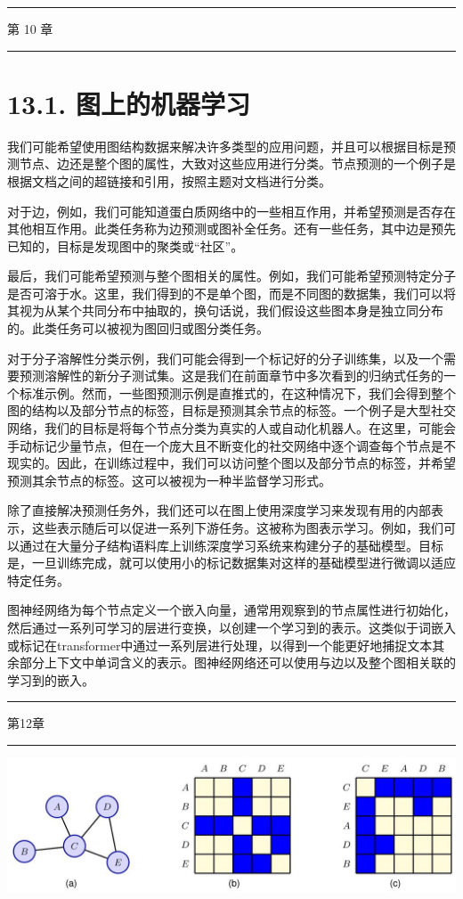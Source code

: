 \documentclass[10pt]{article}
\newcommand{\HRule}{\begin{center}\rule{0.9\linewidth}{0.2mm}\end{center}}
\begin{document}
\HRule

第 10 章

\HRule

\section*{13.1. 图上的机器学习}

我们可能希望使用图结构数据来解决许多类型的应用问题，并且可以根据目标是预测节点、边还是整个图的属性，大致对这些应用进行分类。节点预测的一个例子是根据文档之间的超链接和引用，按照主题对文档进行分类。

对于边，例如，我们可能知道蛋白质网络中的一些相互作用，并希望预测是否存在其他相互作用。此类任务称为边预测或图补全任务。还有一些任务，其中边是预先已知的，目标是发现图中的聚类或“社区”。

最后，我们可能希望预测与整个图相关的属性。例如，我们可能希望预测特定分子是否可溶于水。这里，我们得到的不是单个图，而是不同图的数据集，我们可以将其视为从某个共同分布中抽取的，换句话说，我们假设这些图本身是独立同分布的。此类任务可以被视为图回归或图分类任务。

对于分子溶解性分类示例，我们可能会得到一个标记好的分子训练集，以及一个需要预测溶解性的新分子测试集。这是我们在前面章节中多次看到的归纳式任务的一个标准示例。然而，一些图预测示例是直推式的，在这种情况下，我们会得到整个图的结构以及部分节点的标签，目标是预测其余节点的标签。一个例子是大型社交网络，我们的目标是将每个节点分类为真实的人或自动化机器人。在这里，可能会手动标记少量节点，但在一个庞大且不断变化的社交网络中逐个调查每个节点是不现实的。因此，在训练过程中，我们可以访问整个图以及部分节点的标签，并希望预测其余节点的标签。这可以被视为一种半监督学习形式。

除了直接解决预测任务外，我们还可以在图上使用深度学习来发现有用的内部表示，这些表示随后可以促进一系列下游任务。这被称为图表示学习。例如，我们可以通过在大量分子结构语料库上训练深度学习系统来构建分子的基础模型。目标是，一旦训练完成，就可以使用小的标记数据集对这样的基础模型进行微调以适应特定任务。

图神经网络为每个节点定义一个嵌入向量，通常用观察到的节点属性进行初始化，然后通过一系列可学习的层进行变换，以创建一个学习到的表示。这类似于词嵌入或标记在transformer中通过一系列层进行处理，以得到一个能更好地捕捉文本其余部分上下文中单词含义的表示。图神经网络还可以使用与边以及整个图相关联的学习到的嵌入。

\HRule

第12章

\HRule

\begin{center}
\includegraphics[max width=1.0\textwidth]{images/0194e279-9b28-703a-88f4-c3ac21e2010d_429_239_348_1305_388_0.jpg}
\end{center}
\hspace*{3em} 
\end{document}
